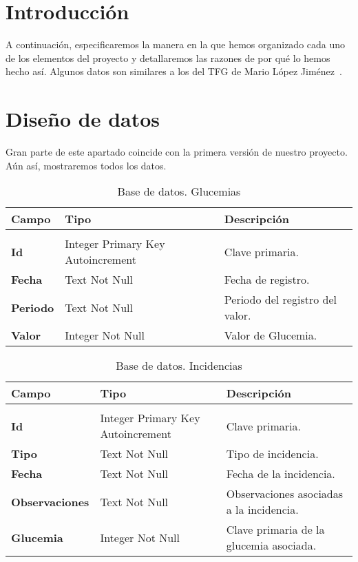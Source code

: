 
\section{Introducción}
A continuación, especificaremos la manera en la que hemos organizado cada uno de los elementos del proyecto y detallaremos las razones de por qué lo hemos hecho así. Algunos datos son similares a los del TFG de Mario López Jiménez~\cite{mario2016}.
\section{Diseño de datos}
Gran parte de este apartado coincide con la primera versión de nuestro proyecto. Aún así, mostraremos todos los datos.
\begin{table}[]
	\centering
	\caption{Base de datos. Glucemias}
	\label{tabla:BDGlucemias}
	\begin{tabular}{l p{4cm} p{4cm}}
	\toprule
	\textbf{Campo}     &\textbf{Tipo} 				& \textbf{Descripción} 		\\ 	\midrule    \\ 	
	\textbf{Id}        & Integer Primary Key Autoincrement  	& Clave primaria.\\ 
	\textbf{Fecha}     & Text	Not Null					   	& Fecha de registro.\\ 
	\textbf{Periodo}   & Text   Not Null						& Periodo del registro del valor.\\ 
	\textbf{Valor}     & Integer Not Null						& Valor de Glucemia.               	   
\\ \bottomrule
\end{tabular}
\end{table}
\begin{table}[]
	\centering
	\caption{Base de datos. Incidencias}
	\label{tabla:BDIncidencias}
	\rowcolors {2}{gray!35}{}
	\begin{tabular}{l p{4cm} p{4cm}}
	\toprule
	\textbf{Campo}     &\textbf{Tipo} 				& \textbf{Descripción} 		\\ 	\midrule    \\ 	
	\textbf{Id}        & Integer Primary Key Autoincrement  	& Clave primaria.\\ 
	\textbf{Tipo}	   & Text Not Null							& Tipo de incidencia.\\
	\textbf{Fecha}     & Text Not Null							& Fecha de la incidencia. \\ 
	\textbf{Observaciones}   & Text Not Null					& Observaciones asociadas a la incidencia.\\ 
	\textbf{Glucemia}  & Integer Not Null						& Clave primaria de la glucemia asociada.                	   
\\ \bottomrule
\end{tabular}
\end{table}
